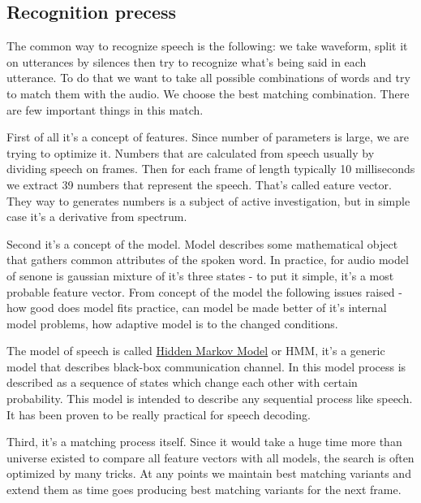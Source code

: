 \documentclass[12pt,a4paper,oldfontcommands]{memoir}
\begin{document}
\subsection{Recognition precess}
 The common way to recognize speech is the following: we take waveform, split it on utterances by silences then try to recognize what's being said in each utterance. To do that we want to take all possible combinations of words and try to match them with the audio. We choose the best matching combination. There are few important things in this match.

First of all it's a concept of features. Since number of parameters is large, we are trying to optimize it. Numbers that are calculated from speech usually by dividing speech on frames. Then for each frame of length typically 10 milliseconds we extract 39 numbers that represent the speech. That's called eature vector. They way to generates numbers is a subject of active investigation, but in simple case it's a derivative from spectrum.

Second it's a concept of the model. Model describes some mathematical object that gathers common attributes of the spoken word. In practice, for audio model of senone is gaussian mixture of it's three states - to put it simple, it's a most probable feature vector. From concept of the model the following issues raised - how good does model fits practice, can model be made better of it's internal model problems, how adaptive model is to the changed conditions.

The model of speech is called \underline{Hidden Markov Model} or HMM, it's a generic model that describes black-box communication channel. In this model process is described as a sequence of states which change each other with certain probability. This model is intended to describe any sequential process like speech. It has been proven to be really practical for speech decoding.

Third, it's a matching process itself. Since it would take a huge time more than universe existed to compare all feature vectors with all models, the search is often optimized by many tricks. At any points we maintain best matching variants and extend them as time goes producing best matching variants for the next frame.
\end{document}
